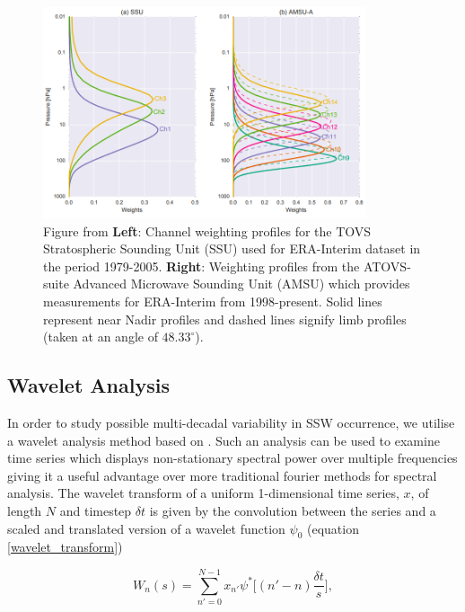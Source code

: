 \begin{figure}[h!]
\centering
    \includegraphics[width=0.85\textwidth]{Figures/Figures-origins/channels.png}
    \caption[Channel profiles for satellite retrievals assimilated by ERA-Interim]{Figure from \cite{fujiwaraIntroduction2017} \textbf{Left}: Channel weighting profiles for the TOVS Stratospheric Sounding Unit (SSU) used for ERA-Interim dataset in the period 1979-2005. \textbf{Right}: Weighting profiles from the ATOVS-suite Advanced Microwave Sounding Unit (AMSU) which provides measurements for ERA-Interim from 1998-present. Solid lines represent near Nadir profiles and dashed lines signify limb profiles (taken at an angle of $48.33^{\circ}$).}
    \label{fig:Satellite_channels}
\centering
\end{figure}

\subsection{Wavelet Analysis}
\label{sec:Wavelet_Analysis}
In order to study possible multi-decadal variability in SSW occurrence, we utilise a wavelet analysis method based on \cite{Torrence1998}. Such an analysis can be used to examine time series which displays non-stationary spectral power over multiple frequencies \citep{Daubechies} giving it a useful advantage over more traditional fourier methods for spectral analysis. The wavelet transform of a uniform 1-dimensional time series, $x$, of length $N$ and timestep $\delta t$ is given by the convolution between the series and a scaled and translated version of a wavelet function $\psi_0$ (equation \ref{wavelet_transform})

\begin{equation} \label{wavelet_transform}
W_n(s) = \sum^{N - 1}_{n' = 0} x_{n'} \psi^* \bigg[(n' - n) \frac{\delta t}{s}\bigg],
\end{equation}

